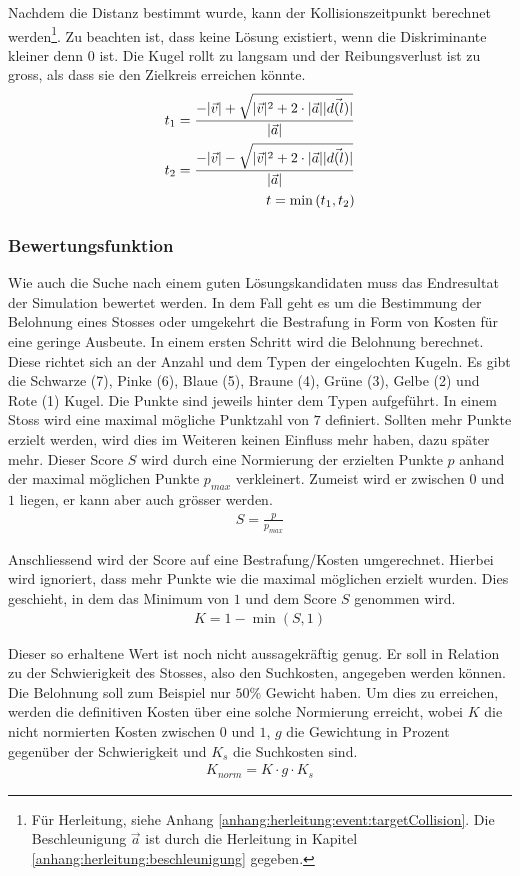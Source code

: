 Nachdem die Distanz bestimmt wurde, kann der Kollisionszeitpunkt berechnet werden\footnote{Für Herleitung, siehe Anhang \ref{anhang:herleitung:event:targetCollision}.
Die Beschleunigung $\vec{a}$ ist durch die Herleitung in Kapitel \ref{anhang:herleitung:beschleunigung} gegeben.}.
Zu beachten ist, dass keine Lösung existiert, wenn die Diskriminante kleiner denn $0$ ist. Die Kugel rollt zu langsam und
der Reibungsverlust ist zu gross, als dass sie den Zielkreis erreichen könnte.
\begin{align}
    t_1 = \frac{-\lvert \vec{v} \rvert + \sqrt{\lvert \vec{v} \rvert^2 + 2 \cdot \lvert \vec{a} \rvert \lvert \vec{d(l)} \rvert}}{\lvert \vec{a} \rvert}\\
    t_2 = \frac{-\lvert \vec{v} \rvert - \sqrt{\lvert \vec{v} \rvert^2 + 2 \cdot \lvert \vec{a} \rvert \lvert \vec{d(l)} \rvert}}{\lvert \vec{a} \rvert}\\
    t = \min{(t_1, t_2)}
\end{align}

\subsubsection{Bewertungsfunktion}
Wie auch die Suche nach einem guten Lösungskandidaten muss das Endresultat der Simulation bewertet werden.
In dem Fall geht es um die Bestimmung der Belohnung eines Stosses oder umgekehrt die Bestrafung in Form von Kosten
für eine geringe Ausbeute. In einem ersten Schritt wird die Belohnung berechnet.
Diese richtet sich an der Anzahl und dem Typen der eingelochten Kugeln. Es gibt die Schwarze (7), Pinke (6), Blaue (5),
Braune (4), Grüne (3), Gelbe (2) und Rote (1) Kugel. Die Punkte sind jeweils hinter dem Typen aufgeführt.
In einem Stoss wird eine maximal mögliche Punktzahl von $7$ definiert. Sollten mehr Punkte erzielt werden, wird dies im
Weiteren keinen Einfluss mehr haben, dazu später mehr. Dieser Score $S$ wird durch eine Normierung der erzielten Punkte $p$ anhand der
maximal möglichen Punkte $p_{max}$ verkleinert. Zumeist wird er zwischen $0$ und $1$ liegen, er kann aber auch grösser werden.
\begin{align}
    S = \frac{p}{p_{max}}
\end{align}

Anschliessend wird der Score auf eine Bestrafung/Kosten umgerechnet. Hierbei wird ignoriert, dass mehr Punkte wie die maximal
möglichen erzielt wurden. Dies geschieht, in dem das Minimum von $1$ und dem Score $S$ genommen wird.
\begin{align}
    K = 1 - \min{(S, 1)}
\end{align}

Dieser so erhaltene Wert ist noch nicht aussagekräftig genug. Er soll in Relation zu der Schwierigkeit des Stosses, also
den Suchkosten, angegeben werden können. Die Belohnung soll zum Beispiel nur $50 \%$ Gewicht haben. Um dies zu erreichen,
werden die definitiven Kosten über eine solche Normierung erreicht, wobei $K$ die nicht normierten Kosten zwischen $0$ und
$1$, $g$ die Gewichtung in Prozent gegenüber der Schwierigkeit und $K_{s}$ die Suchkosten sind.
\begin{align}
    K_{norm} = K \cdot g \cdot K_{s}
\end{align}